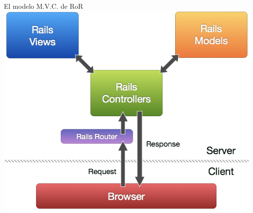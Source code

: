 \begin{frame}{El modelo M.V.C. de RoR}
  \centering
  \includegraphics[scale=0.3]{img/railsmvc}
\end{frame}


